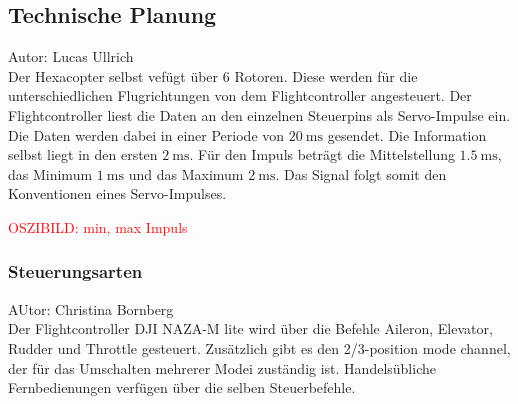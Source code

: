  \subsection{Technische Planung}
  Autor: Lucas Ullrich\\
  Der Hexacopter selbst vefügt über 6 Rotoren. Diese werden für die unterschiedlichen Flugrichtungen von dem Flightcontroller angesteuert.
  Der Flightcontroller liest die Daten an den einzelnen Steuerpins als Servo-Impulse ein. Die Daten werden dabei in einer Periode von $\SI{20}{\milli\second}$ gesendet.
  Die Information selbst liegt in den ersten $\SI{2}{\milli\second}$. Für den Impuls beträgt die Mittelstellung $\SI{1.5}{\milli\second}$, das Minimum $\SI{1}{\milli\second}$
  und das Maximum $\SI{2}{\milli\second}$. Das Signal folgt somit den Konventionen eines Servo-Impulses.

  \textcolor{red}{OSZIBILD: min, max Impuls}


    \subsubsection{Steuerungsarten}
    AUtor: Christina Bornberg\\
    Der Flightcontroller DJI NAZA-M lite wird über die Befehle Aileron, Elevator, Rudder und Throttle gesteuert. Zusätzlich gibt es den 2/3-position mode channel, der für das Umschalten mehrerer Modei zuständig ist. Handelsübliche Fernbedienungen verfügen über die selben Steuerbefehle. \cite{GrundlagenMulticopter}

